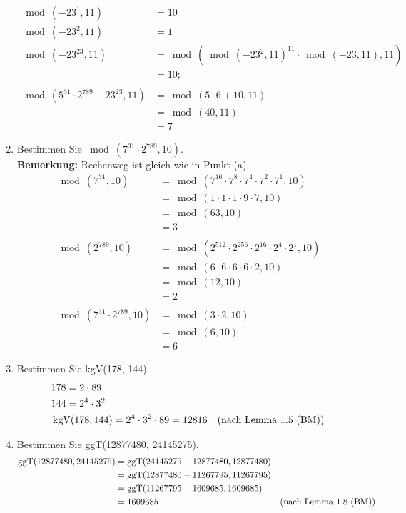 \begin{enumerate}[label=(\alph*)]
\begin{align*}
			 \\\\
			\bmod(-23^{1},11) &=10\\
			\bmod(-23^2,11)&= 1 \\
			\bmod(-23^{23},11) &= \bmod(\bmod(-23^2,11)^{11} \cdot \bmod(-23,11),11) \\ 
			&= 10;
			\\\\ 
			\bmod(5^{31} \cdot 2^{789}-23^{23}, 11) &= \bmod(5 \cdot 6 +10,11)
			\\&= \bmod(40,11)
			\\&= 7 
		\end{align*}

		\item  Bestimmen Sie $ \bmod(7^{31} \cdot 2^{789}, 10) $. \\
		\textbf{Bemerkung:} Rechenweg ist gleich wie in Punkt (a).
		\begin{align*}
			\bmod(7^{31},10) &= \bmod(7^{16}\cdot7^{8}\cdot7^{4}\cdot7^{2}\cdot7^{1},10)
			\\&= \bmod(1\cdot1\cdot1\cdot9\cdot7,10)
			\\&= \bmod(63,10)
			\\&= 3 \\\\
			\bmod(2^{789},10) &= \bmod(2^{512}\cdot2^{256}\cdot2^{16}\cdot2^4\cdot2^1,10)
			\\&= \bmod(6\cdot 6\cdot 6\cdot 6\cdot 2, 10)
			\\&= \bmod(12,10)
			\\&= 2 \\\\
			\bmod(7^{31} \cdot 2^{789}, 10) &= \bmod(3 \cdot 2,10)
			\\&= \bmod(6,10)
			\\&= 6 
		\end{align*}

		\item Bestimmen Sie kgV(178, 144).
		\begin{align*}
			& 178 = 2\cdot89 \\
			& 144 = 2^4\cdot3^2 \\
			&\operatorname{kgV}(178, 144) = 2^4\cdot3^2\cdot89 = 12816
		 	&\textrm{(nach Lemma 1.5 (BM))}
		\end{align*}

		\item Bestimmen Sie ggT(12877480, 24145275).
		\begin{align*}
			\operatorname{ggT}(12877480, 24145275) &= \operatorname{ggT}(24145275-12877480, 12877480)
			\\& = \operatorname{ggT}(12877480-11267795,11267795)
			\\& = \operatorname{ggT}(11267795-1609685,1609685)
			\\& = 1609685
		 	&\textrm{(nach Lemma 1.8 (BM))}
		\end{align*}


\end{enumerate}
